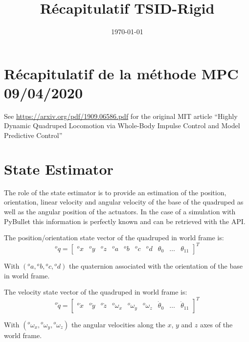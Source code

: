 \documentclass[a4paper,11pt]{article}
\title{Récapitulatif TSID-Rigid}
\author{}
\date{\today}
\newcommand{\PRLsep}{\noindent\makebox[\linewidth]{\resizebox{0.3333\linewidth}{1pt}{$\bullet$}}}%
\begin{document}

\section*{Récapitulatif de la méthode MPC 09/04/2020}

\vspace{0.8cm}
\PRLsep
\vspace{0.5cm}

See \url{https://arxiv.org/pdf/1909.06586.pdf} for the original MIT article ``Highly Dynamic Quadruped Locomotion via Whole-Body Impulse Control and Model Predictive Control''

\section*{State Estimator}

The role of the state estimator is to provide an estimation of the position, orientation, linear velocity and angular velocity of the base of the quadruped as well as the angular position of the actuators. In the case of a simulation with PyBullet this information is perfectly known and can be retrieved with the API.

The position/orientation state vector of the quadruped in world frame is:
\begin{equation}
{}^o\!q = \begin{bmatrix} {}^o\!x & {}^o\!y & {}^o\!z & {}^o\!a & {}^o\!b & {}^o\!c & {}^o\!d & \theta_0 & \dots & \theta_{11} \end{bmatrix}^T
\end{equation}

With $({}^o\!a,{}^o\!b,{}^o\!c,{}^o\!d)$ the quaternion associated with the orientation of the base in world frame.

The velocity state vector of the quadruped in world frame is:
\begin{equation}
{}^o\!\dot q = \begin{bmatrix} {}^o\!\dot x & {}^o\!\dot y & {}^o\!\dot z & {}^o\!\omega_x & {}^o\!\omega_y & {}^o\!\omega_z & \dot \theta_0 & \dots & \dot \theta_{11} \end{bmatrix}^T
\end{equation}

With $({}^o\!\omega_x, {}^o\!\omega_y, {}^o\!\omega_z)$ the angular velocities along the $x$, $y$ and $z$ axes of the world frame.
\end{document}
